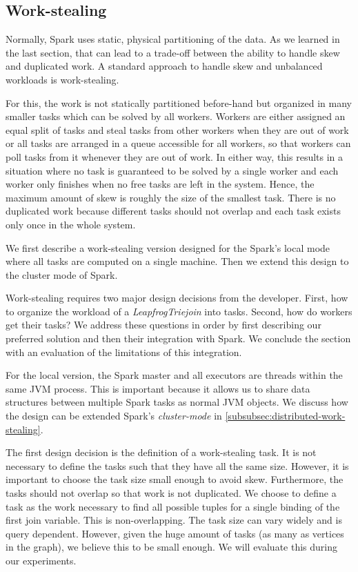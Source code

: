 \subsection{Work-stealing} \label{subsec:work-stealing}
Normally, Spark uses static, physical partitioning of the data.
As we learned in the last section, that can lead to a trade-off between the ability to handle skew and duplicated work.
A standard approach to handle skew and unbalanced workloads is work-stealing.

For this, the work is not statically partitioned before-hand but organized in many smaller tasks which can be
solved by all workers.
Workers are either assigned an equal split of tasks and steal tasks from other workers when they are out of work or all tasks are arranged
in a queue accessible for all workers, so that workers can poll tasks from it whenever they are out of work.
In either way, this results in a situation where no task is guaranteed to be solved by a single worker and each worker only finishes
when no free tasks are left in the system.
Hence, the maximum amount of skew is roughly the size of the smallest task.
There is no duplicated work because different tasks should not overlap and each task exists only once in the whole system.

We first describe a work-stealing version designed for the Spark's local mode where all tasks are computed on a single machine.
Then we extend this design to the cluster mode of Spark.

Work-stealing requires two major design decisions from the developer.
First, how to organize the workload of a \textit{LeapfrogTriejoin} into tasks.
Second, how do workers get their tasks?
We address these questions in order by first describing our preferred solution and then their integration with Spark.
We conclude the section with an evaluation of the limitations of this integration.

For the local version, the Spark master and all executors are threads within the same JVM process.
This is important because it allows us to share data structures between multiple Spark tasks as normal JVM objects.
We discuss how the design can be extended Spark's \textit{cluster-mode} in \cref{subsubsec:distributed-work-stealing}.

The first design decision is the definition of a work-stealing task.
It is not necessary to define the tasks such that they have all the same size.
However, it is important to choose the task size small enough to avoid skew.
Furthermore, the tasks should not overlap so that work is not duplicated.
We choose to define a task as the work necessary to find all possible tuples for a single binding of the first join variable.
This is non-overlapping.
The task size can vary widely and is query dependent.
However, given the huge amount of tasks (as many as vertices in the graph), we believe this to be small enough.
We will evaluate this during our experiments.

